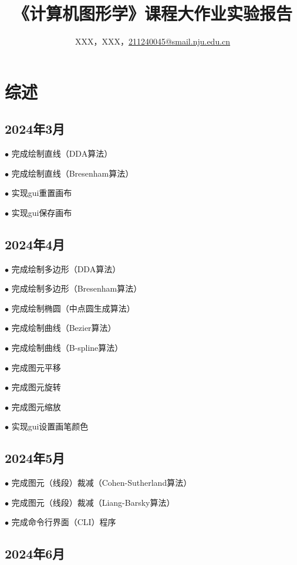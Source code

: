 \documentclass[a4paper,UTF8]{article}
\theoremstyle{definition}
\begin{document}
\title{\textbf{《计算机图形学》课程大作业实验报告}}
\author{XXX，XXX，\href{mailto:211240045@smail.nju.edu.cn}{211240045@smail.nju.edu.cn}}
\maketitle
\tableofcontents 
\newpage
\section{综述}

\subsection{2024年3月}

$\bullet$ 完成绘制直线（DDA算法）

$\bullet$ 完成绘制直线（Bresenham算法）

$\bullet$ 实现gui重置画布

$\bullet$ 实现gui保存画布

\subsection{2024年4月}

$\bullet$ 完成绘制多边形（DDA算法）

$\bullet$ 完成绘制多边形（Bresenham算法）

$\bullet$ 完成绘制椭圆（中点圆生成算法）

$\bullet$ 完成绘制曲线（Bezier算法）

$\bullet$ 完成绘制曲线（B-spline算法）

$\bullet$ 完成图元平移

$\bullet$ 完成图元旋转

$\bullet$ 完成图元缩放

$\bullet$ 实现gui设置画笔颜色

\subsection{2024年5月}

$\bullet$ 完成图元（线段）裁减（Cohen-Sutherland算法）

$\bullet$ 完成图元（线段）裁减（Liang-Barsky算法）

$\bullet$ 完成命令行界面（CLI）程序

\subsection{2024年6月}
\end{document}
